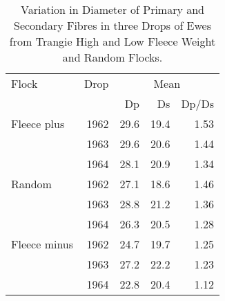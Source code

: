 %

\begin{table}[h]
\centering
\caption{Variation in Diameter of Primary and Secondary Fibres in three Drops
	 of Ewes from Trangie High and Low Fleece Weight and Random Flocks.}
 \label{tb:7} 
\vspace{0.1in}

\begin{tabular}{l|r|rrr}  \hline
 Flock & Drop & \multicolumn{3}{c}{Mean}  \\ \cline{3-5}
        &       & Dp & Ds & Dp/Ds \\ \hline

  
  Fleece plus      & 1962    &  29.6   &  19.4    &  1.53 \\
  
                   & 1963    &  29.6   &  20.6    &  1.44 \\
  
                   & 1964    &  28.1   &  20.9    &  1.34 \\ \hline
  
  
   Random          & 1962    &  27.1   &  18.6    &  1.46 \\
  
                   & 1963    &  28.8   &  21.2    &  1.36 \\
  
                   & 1964    &  26.3   &  20.5    &  1.28 \\ \hline
  
  
   Fleece minus    & 1962    &  24.7   &  19.7    &  1.25 \\
  
                   & 1963    &  27.2   &  22.2    &  1.23 \\
  
                   & 1964    &  22.8   &  20.4    &  1.12 \\ \hline
\end{tabular}
\end{table}

%

